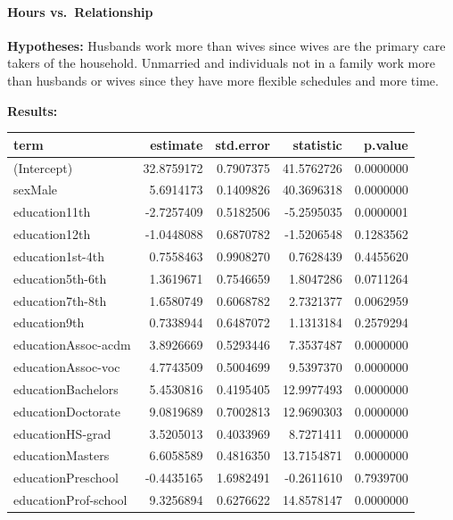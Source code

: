 \documentclass[]{article}
\let\oldparagraph\paragraph
\renewcommand{\paragraph}[1]{\oldparagraph{#1}\mbox{}}
\begin{document}
\hypertarget{hours-vs.-relationship}{%
\paragraph{Hours vs.~Relationship}\label{hours-vs.-relationship}}

\textbf{Hypotheses:} Husbands work more than wives since wives are the
primary care takers of the household. Unmarried and individuals not in a
family work more than husbands or wives since they have more flexible
schedules and more time.

\textbf{Results:}

\begin{table}[H]
\centering
\begin{tabular}{l|r|r|r|r}
\hline
term & estimate & std.error & statistic & p.value\\
\hline
(Intercept) & 32.8759172 & 0.7907375 & 41.5762726 & 0.0000000\\
\hline
sexMale & 5.6914173 & 0.1409826 & 40.3696318 & 0.0000000\\
\hline
education11th & -2.7257409 & 0.5182506 & -5.2595035 & 0.0000001\\
\hline
education12th & -1.0448088 & 0.6870782 & -1.5206548 & 0.1283562\\
\hline
education1st-4th & 0.7558463 & 0.9908270 & 0.7628439 & 0.4455620\\
\hline
education5th-6th & 1.3619671 & 0.7546659 & 1.8047286 & 0.0711264\\
\hline
education7th-8th & 1.6580749 & 0.6068782 & 2.7321377 & 0.0062959\\
\hline
education9th & 0.7338944 & 0.6487072 & 1.1313184 & 0.2579294\\
\hline
educationAssoc-acdm & 3.8926669 & 0.5293446 & 7.3537487 & 0.0000000\\
\hline
educationAssoc-voc & 4.7743509 & 0.5004699 & 9.5397370 & 0.0000000\\
\hline
educationBachelors & 5.4530816 & 0.4195405 & 12.9977493 & 0.0000000\\
\hline
educationDoctorate & 9.0819689 & 0.7002813 & 12.9690303 & 0.0000000\\
\hline
educationHS-grad & 3.5205013 & 0.4033969 & 8.7271411 & 0.0000000\\
\hline
educationMasters & 6.6058589 & 0.4816350 & 13.7154871 & 0.0000000\\
\hline
educationPreschool & -0.4435165 & 1.6982491 & -0.2611610 & 0.7939700\\
\hline
educationProf-school & 9.3256894 & 0.6276622 & 14.8578147 & 0.0000000\\

\end{tabular}
\end{table}
\end{document}
